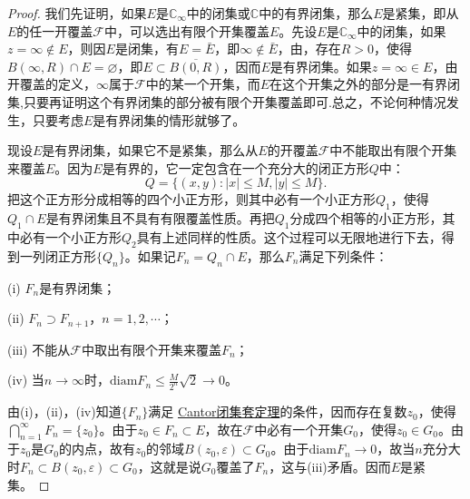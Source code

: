 \documentclass[../../main.tex]{subfiles}%
\begin{document}
\begin{proof}
我们先证明，如果\(E\)是\(\mathbb{C}_\infty\)中的闭集或\(\mathbb{C}\)中的有界闭集，那么\(E\)是紧集，即从\(E\)的任一开覆盖\(\mathscr{F}\)中，可以选出有限个开集覆盖\(E\)。先设\(E\)是\(\mathbb{C}_\infty\)中的闭集，如果\(z = \infty \notin E\)，则因\(E\)是闭集，有\(E = \bar{E}\)，即\(\infty \notin \bar{E}\)，由，存在\(R > 0\)，使得\(B(\infty, R) \cap E = \varnothing\)，即\(E \subset \overline{B(0, R)}\)，因而\(E\)是有界闭集。如果\(z = \infty \in E\)，由开覆盖的定义，\(\infty\)属于\(\mathscr{F}\)中的某一个开集，而\(E\)在这个开集之外的部分是一有界闭集,只要再证明这个有界闭集的部分被有限个开集覆盖即可.总之，不论何种情况发生，只要考虑\(E\)是有界闭集的情形就够了。

现设\(E\)是有界闭集，如果它不是紧集，那么从\(E\)的开覆盖\(\mathscr{F}\)中不能取出有限个开集来覆盖\(E\)。因为\(E\)是有界的，它一定包含在一个充分大的闭正方形\(Q\)中：
\[
Q = \{ (x, y) : | x | \leqslant M, | y | \leqslant M \}.
\]
把这个正方形分成相等的四个小正方形，则其中必有一个小正方形\(Q_1\)，使得\(Q_1 \cap E\)是有界闭集且不具有有限覆盖性质。再把\(Q_1\)分成四个相等的小正方形，其中必有一个小正方形\(Q_2\)具有上述同样的性质。这个过程可以无限地进行下去，得到一列闭正方形\(\{ Q_n \}\)。如果记\(F_n = Q_n \cap E\)，那么\(F_n\)满足下列条件：

(i) \(F_n\)是有界闭集；

(ii) \(F_n \supset F_{n + 1}\)，\(n = 1, 2, \cdots\)；

(iii) 不能从\(\mathscr{F}\)中取出有限个开集来覆盖\(F_n\)；

(iv) 当\(n \to \infty\)时，\(\mathrm{diam}F_n \leqslant \frac{M}{2^n} \sqrt{2} \to 0\)。

由(i)，(ii)，(iv)知道\(\{ F_n \}\)满足 \hyperref[theorem:复变函数--Cantor闭集套定理]{Cantor闭集套定理}的条件，因而存在复数\(z_0\)，使得\(\bigcap_{n = 1}^\infty F_n = \{ z_0 \}\)。由于\(z_0 \in F_n \subset E\)，故在\(\mathscr{F}\)中必有一个开集\(G_0\)，使得\(z_0 \in G_0\)。由于\(z_0\)是\(G_0\)的内点，故有\(z_0\)的邻域\(B(z_0, \varepsilon) \subset G_0\)。由于\(\mathrm{diam}F_n \to 0\)，故当\(n\)充分大时\(F_n \subset B(z_0, \varepsilon) \subset G_0\)，这就是说\(G_0\)覆盖了\(F_n\)，这与(iii)矛盾。因而\(E\)是紧集。


\end{proof}
\end{document}
